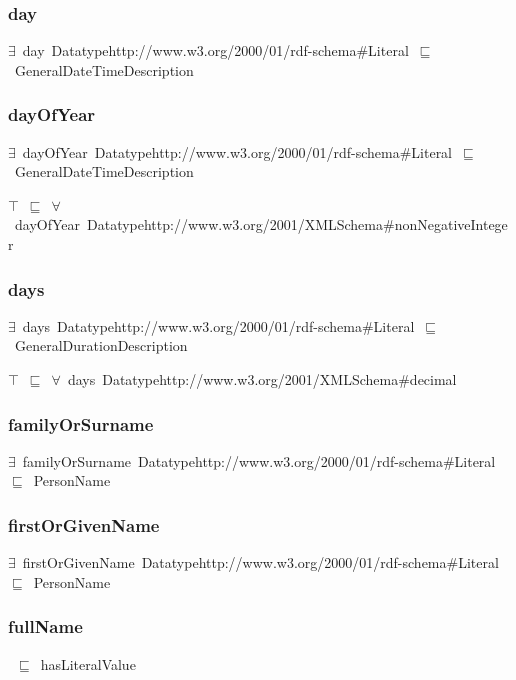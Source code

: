 \documentclass{article}
\begin{document}
\subsubsection*{day}

\ensuremath{\exists}~day~Datatypehttp://www.w3.org/2000/01/rdf-schema#Literal~\ensuremath{\sqsubseteq}~GeneralDateTimeDescription

\subsubsection*{dayOfYear}

\ensuremath{\exists}~dayOfYear~Datatypehttp://www.w3.org/2000/01/rdf-schema#Literal~\ensuremath{\sqsubseteq}~GeneralDateTimeDescription

\ensuremath{\top}~\ensuremath{\sqsubseteq}~\ensuremath{\forall}~dayOfYear~Datatypehttp://www.w3.org/2001/XMLSchema#nonNegativeInteger

\subsubsection*{days}

\ensuremath{\exists}~days~Datatypehttp://www.w3.org/2000/01/rdf-schema#Literal~\ensuremath{\sqsubseteq}~GeneralDurationDescription

\ensuremath{\top}~\ensuremath{\sqsubseteq}~\ensuremath{\forall}~days~Datatypehttp://www.w3.org/2001/XMLSchema#decimal

\subsubsection*{familyOrSurname}

\ensuremath{\exists}~familyOrSurname~Datatypehttp://www.w3.org/2000/01/rdf-schema#Literal~\ensuremath{\sqsubseteq}~PersonName

\subsubsection*{firstOrGivenName}

\ensuremath{\exists}~firstOrGivenName~Datatypehttp://www.w3.org/2000/01/rdf-schema#Literal~\ensuremath{\sqsubseteq}~PersonName

\subsubsection*{fullName}

~\ensuremath{\sqsubseteq}~hasLiteralValue
\end{document}
